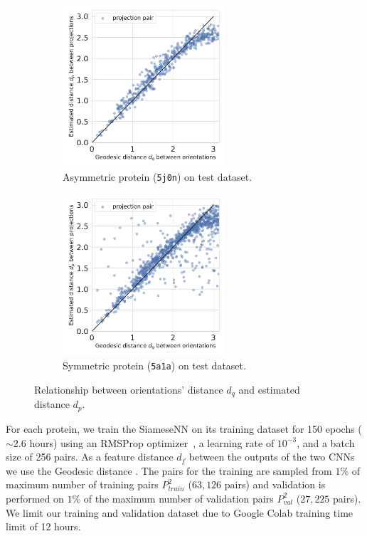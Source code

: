 \begin{figure}
    \centering
    \begin{subfigure}[b]{0.5\columnwidth}
        \includegraphics[height=6cm]{figures/dPdQ_5j0n}
        \caption{Asymmetric protein (\texttt{5j0n}) on test dataset.}
    \end{subfigure}
    \begin{subfigure}[b]{0.45\columnwidth}
    \centering
        \includegraphics[height=6cm]{figures/dPdQ_5a1a}
        \caption{Symmetric protein (\texttt{5a1a}) on test dataset.}
    \end{subfigure}
    \caption{Relationship between orientations' distance $d_q$ and estimated distance $d_p$.}
    \label{fig:learned-distance-siamese}
\end{figure}

For each protein, we train the SiameseNN on its training dataset for 150 epochs ($\sim$2.6 hours) using an RMSProp optimizer~\cite{noauthor_tfkerasoptimizersrmsprop_nodate}, a learning rate of $10^{-3}$, and a batch size of 256 pairs. As a feature distance $d_f$ between the outputs of the two CNNs we use the Geodesic distance .
The pairs for the training are sampled from $1\%$ of maximum number of training pairs $P_{train}^2$ ($63,126$ pairs) and validation is performed on $1\%$ of the maximum number of validation pairs $P_{val}^2$ ($27,225$ pairs). We limit our training and validation dataset due to Google Colab training time limit of 12 hours.

